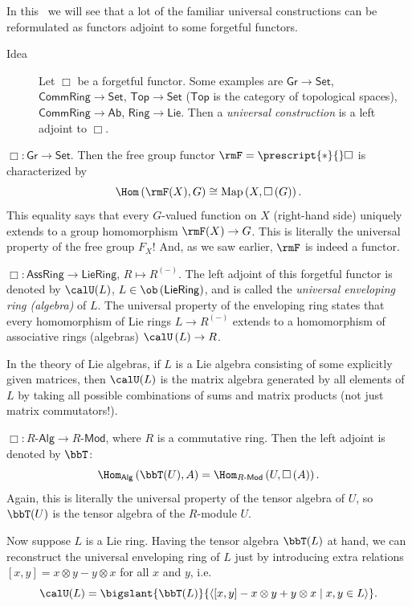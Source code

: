 In this \sect\ we will see that a lot of the familiar universal constructions
can be reformulated as functors adjoint to some forgetful functors. 
\begin{description}
\item [{Idea}] Let $\Box$ be a forgetful functor. Some examples are $\mathsf{Gr}\to\mathsf{Set}$,
$\mathsf{CommRing}\to\mathsf{Set}$, $\mathsf{Top}\to\mathsf{Set}$
($\mathsf{Top}$ is the category of topological spaces), $\mathsf{CommRing}\to\mathsf{Ab}$,
$\mathsf{Ring}\to\mathsf{Lie}$. Then a \emph{universal construction}
is a left adjoint to $\Box$.
\end{description}
\begin{example}
    $\Box:\mathsf{Gr}\to\mathsf{Set}$. Then the free group functor $\rmF=\prescript{\ast}{}\Box$ is characterized
    by 
    \[
    \Hom\left(\rmF(X),G\right)\cong\mathrm{Map}\left(X,\Box\left(G\right)\right).
    \]
    This equality says that every $G$-valued function on $X$ (right-hand
    side) uniquely extends to a group homomorphism $\rmF(X)\to G$. This
    is literally the universal property of the free group $F_{X}$! And, as we saw earlier, $\rmF$ is indeed a functor.
\end{example}
%
\begin{example}
    $\Box:\mathsf{AssRing}\to\mathsf{LieRing}$, $R\mapsto R^{(-)}$.
    The left adjoint of this forgetful functor is denoted by $\calU(L)$,
    $L\in\ob\left(\mathsf{LieRing}\right)$, and is called the \emph{universal
    enveloping ring (algebra)} of $L$. The universal property of the
    enveloping ring states that every homomorphism of Lie rings $L\to R^{(-)}$
    extends to a homomorphism of associative rings (algebras) $\calU\left(L\right)\to R$. 

    In the theory of Lie algebras, if $L$ is a Lie algebra consisting
    of some explicitly given matrices, then $\calU(L)$ is the matrix algebra
    generated by all elements of $L$ by taking all possible combinations
    of sums and matrix products (not just matrix commutators!).
\end{example}
%
\begin{example}
$\Box:R\text{-}\mathsf{Alg}\to R\text{-}\mathsf{Mod}$, where $R$
is a commutative ring. Then the left adjoint is denoted by $\bbT$:
\[
\Hom_{\mathsf{Alg}}\left(\bbT(U),A\right)=\Hom_{R\text{-}\mathsf{Mod}}\left(U,\Box\left(A\right)\right).
\]
Again, this is literally the universal property of the tensor algebra
of $U$, so $\bbT(U)$ is the tensor algebra of the $R$-module $U$.

Now suppose $L$ is a Lie ring. Having the tensor algebra $\bbT(L)$ at hand, we can reconstruct the
universal enveloping ring of $L$ just by introducing extra relations
$\left[x,y\right]=x\otimes y-y\otimes x$ for all $x$ and $y$, i.e.
\[
\calU(L)=\bigslant{\bbT(L)}{\left\langle [x,y]-x\otimes y+y\otimes x\mid x,y\in L\right\rangle }.
\]
\end{example}







